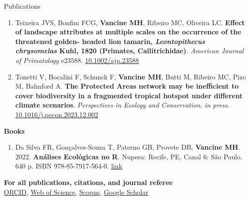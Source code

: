 \documentclass{resume}
\begin{document}
\begin{rSection}{Publications}
\begin{enumerate}
\item Teixeira JVS, Bonfim FCG, {\bf Vancine MH}, Ribeiro MC, Oliveira LC. {\bf Effect
of landscape attributes at multiple scales on the occurrence of the threatened golden-
headed lion tamarin, \textbf{\textit{Leontopithecus chrysomelas}} Kuhl, 1820 (Primates, Callitrichidae)}.
{\it American Journal of Primatology} e23588. \href{https://doi.org/10.1002/ajp.23588}{\underline{10.1002/ajp.23588}}

\item Tonetti V, Bocalini F, Schunck F, {\bf Vancine MH}, Butti M, Ribeiro MC, Pizo M, Balmford A. {\bf The Protected Areas network may be inefficient to cover biodiversity in a fragmented tropical hotspot under different climate scenarios}. {\it Perspectives in Ecology and Conservation}. {\it in press.} \href{https://doi.org/10.1016/j.pecon.2023.12.002}{\underline{10.1016/j.pecon.2023.12.002}}

\end{enumerate} 

{\bf Books}

\begin{enumerate} 
\item Da Silva FR, Gonçalves-Souza T, Paterno GB, Provete DB, {\bf Vancine MH}. 2022. {\bf Análises Ecológicas no R}. Nupeea: Recife, PE, Canal 6: São Paulo. 640 p. ISBN 978-85-7917-564-0. \href{https://analises-ecologicas.com/}{\underline{link}}
\end{enumerate} 

{\bf For all publications, citations, and journal referee}
\\ \href{https://orcid.org/0000-0001-9650-7575}{\underline{ORCID}}, \href{https://www.webofscience.com/wos/author/record/837504}{\underline{Web of Science}}, \href{https://www.scopus.com/authid/detail.uri?authorId=57193451888}{\underline{Scopus}}, \href{https://scholar.google.com/citations?user=i-2xZBQAAAAJ}{\underline{Google Scholar}}

\end{rSection}

\end{document}
